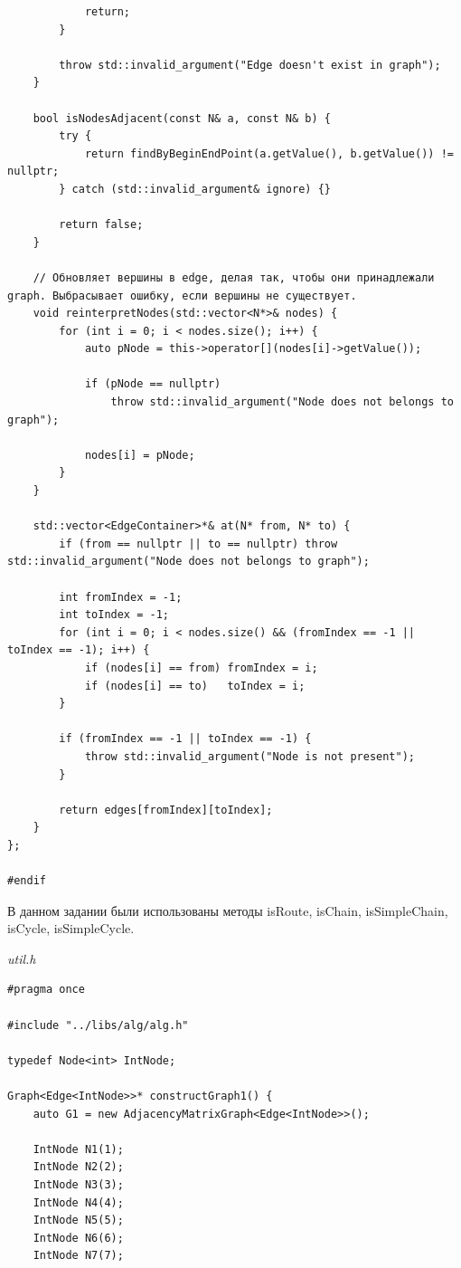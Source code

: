 \documentclass[a4paper,14pt]{extarticle}
\begin{document}
\begin{enumerate}[1.]
\begin{verbatim}
            return;
        }

        throw std::invalid_argument("Edge doesn't exist in graph");
    }

    bool isNodesAdjacent(const N& a, const N& b) {
        try {
            return findByBeginEndPoint(a.getValue(), b.getValue()) != nullptr;
        } catch (std::invalid_argument& ignore) {}

        return false;
    }

    // Обновляет вершины в edge, делая так, чтобы они принадлежали graph. Выбрасывает ошибку, если вершины не существует.
    void reinterpretNodes(std::vector<N*>& nodes) {
        for (int i = 0; i < nodes.size(); i++) {
            auto pNode = this->operator[](nodes[i]->getValue());

            if (pNode == nullptr)
                throw std::invalid_argument("Node does not belongs to graph");

            nodes[i] = pNode;
        }
    }

    std::vector<EdgeContainer>*& at(N* from, N* to) {
        if (from == nullptr || to == nullptr) throw std::invalid_argument("Node does not belongs to graph");

        int fromIndex = -1;
        int toIndex = -1;
        for (int i = 0; i < nodes.size() && (fromIndex == -1 || toIndex == -1); i++) {
            if (nodes[i] == from) fromIndex = i;
            if (nodes[i] == to)   toIndex = i;
        }

        if (fromIndex == -1 || toIndex == -1) {
            throw std::invalid_argument("Node is not present");
        }

        return edges[fromIndex][toIndex];
    }
};

#endif
        \end{verbatim} 

        В данном задании были использованы методы 
        isRoute, isChain, isSimpleChain, isCycle, isSimpleCycle.

        \textit{util.h}
        \begin{verbatim}
#pragma once

#include "../libs/alg/alg.h"

typedef Node<int> IntNode;

Graph<Edge<IntNode>>* constructGraph1() {
    auto G1 = new AdjacencyMatrixGraph<Edge<IntNode>>();

    IntNode N1(1);
    IntNode N2(2);
    IntNode N3(3);
    IntNode N4(4);
    IntNode N5(5);
    IntNode N6(6);
    IntNode N7(7);


\end{verbatim}
\end{enumerate}
\end{document}
